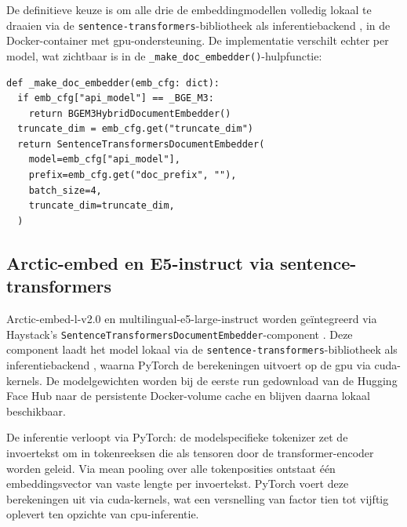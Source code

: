 De definitieve keuze is om alle drie de embeddingmodellen volledig lokaal te draaien via de \texttt{sentence-transformers}-bibliotheek als inferentiebackend \autocite{ReimersGurevych2019}, in de Docker-container met \gls{gpu}-ondersteuning. De implementatie verschilt echter per model, wat zichtbaar is in de \texttt{\_make\_doc\_embedder()}-hulpfunctie:

\begin{listing}[H]
\begin{verbatim}
def _make_doc_embedder(emb_cfg: dict):
  if emb_cfg["api_model"] == _BGE_M3:
    return BGEM3HybridDocumentEmbedder()
  truncate_dim = emb_cfg.get("truncate_dim")
  return SentenceTransformersDocumentEmbedder(
    model=emb_cfg["api_model"],
    prefix=emb_cfg.get("doc_prefix", ""),
    batch_size=4,
    truncate_dim=truncate_dim,
  )
\end{verbatim}
\caption[\_make\_doc\_embedder: modelspecifieke embedder-selectie]{BGE-M3 vereist een afwijkende implementatie omwille van zijn hybride dense+sparse uitvoer en krijgt de custom \texttt{BGEM3HybridDocumentEmbedder}. Arctic-embed en E5-instruct gaan via de standaard Haystack \texttt{SentenceTransformersDocumentEmbedder}.}
\label{lst:make-doc-embedder}
\end{listing}

\subsection{Arctic-embed en E5-instruct via sentence-transformers}

Arctic-embed-l-v2.0 en multilingual-e5-large-instruct worden geïntegreerd via Haystack's \texttt{SentenceTransformersDocumentEmbedder}-component \autocite{HaystackPipelines2026}. Deze component laadt het model lokaal via de \texttt{sentence-transformers}-bibliotheek als inferentiebackend \autocite{ReimersGurevych2019}, waarna PyTorch de berekeningen uitvoert op de \gls{gpu} via \gls{cuda}-kernels. De modelgewichten worden bij de eerste run gedownload van de Hugging Face Hub naar de persistente Docker-volume cache en blijven daarna lokaal beschikbaar.

De inferentie verloopt via PyTorch: de modelspecifieke tokenizer zet de invoertekst om in tokenreeksen die als tensoren door de transformer-encoder worden geleid. Via mean pooling over alle tokenposities ontstaat één embeddingsvector van vaste lengte per invoertekst. PyTorch voert deze berekeningen uit via \gls{cuda}-kernels, wat een versnelling van factor tien tot vijftig oplevert ten opzichte van \gls{cpu}-inferentie.

